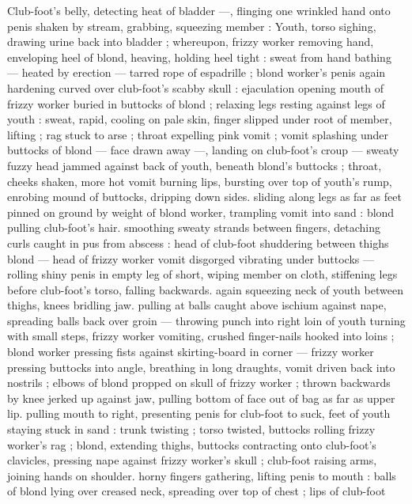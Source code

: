 Club-foot's belly, detecting heat of bladder ---, flinging one wrinkled 
hand onto penis shaken by stream, grabbing, squeezing member : 
Youth, torso sighing, drawing urine back into bladder ; whereupon, 
frizzy worker removing hand, enveloping heel of blond, heaving, 
holding heel tight : sweat from hand bathing --- heated by erection 
--- tarred rope of espadrille ; blond worker's penis again hardening 
curved over club-foot's scabby skull : ejaculation opening mouth of 
frizzy worker buried in buttocks of blond ; relaxing legs resting 
against legs of youth : sweat, rapid, cooling on pale skin, finger 
slipped under root of member, lifting ; rag stuck to arse ; throat 
expelling pink vomit ; vomit splashing under buttocks of blond --- 
face drawn away ---, landing on club-foot's croup --- sweaty fuzzy 
head jammed against back of youth, beneath blond's buttocks ; 
throat, cheeks shaken, more hot vomit burning lips, bursting over top 
of youth's rump, enrobing mound of buttocks, dripping down sides. 
sliding along legs as far as feet pinned on ground by weight of blond 
worker, trampling vomit into sand : blond pulling club-foot's hair. 
smoothing sweaty strands between fingers, detaching curls caught in 
pus from abscess : head of club-foot shuddering between thighs 
blond --- head of frizzy worker vomit disgorged vibrating under 
buttocks --- rolling shiny penis in empty leg of short, wiping member 
on cloth, stiffening legs before club-foot's torso, falling backwards. 
again squeezing neck of youth between thighs, knees bridling jaw. 
pulling at balls caught above ischium against nape, spreading balls 
back over groin --- throwing punch into right loin of youth turning 
with small steps, frizzy worker vomiting, crushed finger-nails hooked 
into loins ; blond worker pressing fists against skirting-board in 
corner --- frizzy worker pressing buttocks into angle, breathing in 
long draughts, vomit driven back into nostrils ; elbows of blond 
propped on skull of frizzy worker ; thrown backwards by knee jerked 
up against jaw, pulling bottom of face out of bag as far as upper lip. 
pulling mouth to right, presenting penis for club-foot to suck, feet of 
youth staying stuck in sand : trunk twisting ; torso twisted, buttocks 
rolling frizzy worker's rag ; blond, extending thighs, buttocks 
contracting onto club-foot's clavicles, pressing nape against frizzy 
worker's skull ; club-foot raising arms, joining hands on shoulder. 
horny fingers gathering, lifting penis to mouth : balls of blond lying 
over creased neck, spreading over top of chest ; lips of club-foot 
